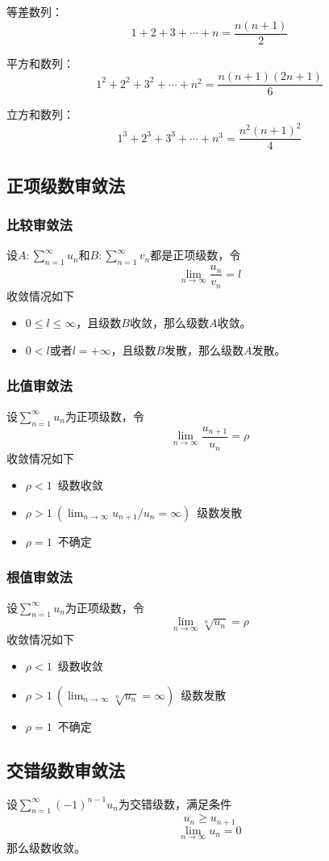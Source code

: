 \documentclass[a4paper,zihao=-4,UTF8]{ctexbook}
\begin{document}
等差数列：
\[1+2+3+\cdots+n=\frac{n(n+1)}{2}\]

平方和数列：
\[1^2+2^2+3^2+\cdots+n^2=\frac{n(n+1)(2n+1)}{6}\]

立方和数列：
\[1^3+2^3+3^3+\cdots+n^3=\frac{n^2(n+1)^2}{4}\]
\subsection{正项级数审敛法}
\subsubsection{比较审敛法}
设$A:\sum_{n=1}^\infty u_n$和$B:\sum_{n=1}^\infty v_n$都是正项级数，令
\[\lim_{n\to\infty}\frac{u_n}{v_n}=l\]
收敛情况如下
\begin{itemize}[nosep,left=2em]
    \item $0\le l \le \infty$，且级数$B$收敛，那么级数$A$收敛。
    \item $0<l$或者$l=+\infty$，且级数$B$发散，那么级数$A$发散。
\end{itemize}
\subsubsection{比值审敛法}
设$\sum_{n=1}^\infty u_n$为正项级数，令
\[\lim_{n\to\infty}\frac{u_{n+1}}{u_n}=\rho\]
收敛情况如下
\begin{itemize}[nosep,left=2em]
    \item $\rho<1$\ 级数收敛
    \item $\rho>1 \ (\lim_{n\to\infty}{u_{n+1}}/{u_n}=\infty)$\  级数发散
    \item $\rho=1$\ 不确定
\end{itemize}
\subsubsection{根值审敛法}
设$\sum_{n=1}^\infty u_n$为正项级数，令
\[\lim_{n\to\infty}\sqrt[n]{u_n}=\rho\]
收敛情况如下
\begin{itemize}[nosep,left=2em]
    \item $\rho<1$\ 级数收敛
    \item $\rho>1 \ (\lim_{n\to\infty}\sqrt[n]{u_n}=\infty)$\  级数发散
    \item $\rho=1$\ 不确定
\end{itemize}
\subsection{交错级数审敛法}
设$\sum_{n=1}^\infty (-1)^{n-1}u_n$为交错级数，满足条件
\[u_n\ge u_{n+1}\]
\[\lim_{n\to\infty}u_n=0\]
那么级数收敛。
\end{document}
